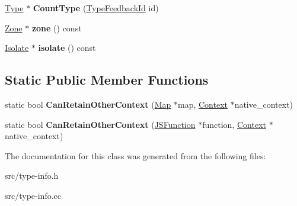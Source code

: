 \begin{DoxyCompactItemize}
\item 
\hypertarget{classv8_1_1internal_1_1_type_feedback_oracle_ae2d2bada2c837f24efd9d10acfb61d68}{}\hyperlink{classv8_1_1internal_1_1_type_impl}{Type} $\ast$ {\bfseries Count\+Type} (\hyperlink{classv8_1_1internal_1_1_type_feedback_id}{Type\+Feedback\+Id} id)\label{classv8_1_1internal_1_1_type_feedback_oracle_ae2d2bada2c837f24efd9d10acfb61d68}

\item 
\hypertarget{classv8_1_1internal_1_1_type_feedback_oracle_a700251044fa557f3c4af2ee2fc415802}{}\hyperlink{classv8_1_1internal_1_1_zone}{Zone} $\ast$ {\bfseries zone} () const \label{classv8_1_1internal_1_1_type_feedback_oracle_a700251044fa557f3c4af2ee2fc415802}

\item 
\hypertarget{classv8_1_1internal_1_1_type_feedback_oracle_abc3aa56ede67a173d4e5e5f2ba4c5f12}{}\hyperlink{classv8_1_1internal_1_1_isolate}{Isolate} $\ast$ {\bfseries isolate} () const \label{classv8_1_1internal_1_1_type_feedback_oracle_abc3aa56ede67a173d4e5e5f2ba4c5f12}

\end{DoxyCompactItemize}
\subsection*{Static Public Member Functions}
\begin{DoxyCompactItemize}
\item 
\hypertarget{classv8_1_1internal_1_1_type_feedback_oracle_ae9a16d285d3a320e527cd9cf1d51e670}{}static bool {\bfseries Can\+Retain\+Other\+Context} (\hyperlink{classv8_1_1internal_1_1_map}{Map} $\ast$map, \hyperlink{classv8_1_1internal_1_1_context}{Context} $\ast$native\+\_\+context)\label{classv8_1_1internal_1_1_type_feedback_oracle_ae9a16d285d3a320e527cd9cf1d51e670}

\item 
\hypertarget{classv8_1_1internal_1_1_type_feedback_oracle_a28ab41602cdaecb65da0cec204c4ecb9}{}static bool {\bfseries Can\+Retain\+Other\+Context} (\hyperlink{classv8_1_1internal_1_1_j_s_function}{J\+S\+Function} $\ast$function, \hyperlink{classv8_1_1internal_1_1_context}{Context} $\ast$native\+\_\+context)\label{classv8_1_1internal_1_1_type_feedback_oracle_a28ab41602cdaecb65da0cec204c4ecb9}

\end{DoxyCompactItemize}


The documentation for this class was generated from the following files\+:\begin{DoxyCompactItemize}
\item 
src/type-\/info.\+h\item 
src/type-\/info.\+cc\end{DoxyCompactItemize}
